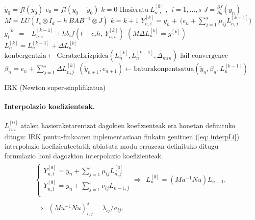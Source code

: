 \begin{algorithm}[H]
 \BlankLine
  $\tilde{y}_0=fl(y_0)$\;
  $e_0=fl(y_0-\tilde{y}_0)$\;
  {
   \BlankLine
   $k=0$\;
   $\text{Hasieratu} \ L_{n,i}^{[0]} \ , \ \ i=1,\dots,s $\;
   \BlankLine
   $J=\frac{\partial f}{\partial y}(y_n) $\; 
   $M=LU(I_s \otimes I_d - h \ BAB^{-1} \otimes J)$\;
   \BlankLine
   {
    \BlankLine 
    $k=k+1$\;
    $Y_{n,i}^{[k]}=y_{n} + \ \big(e_n+\sum\limits_{j=1}^{s} \mu_{ij} L_{n,j}^{[k-1]}\big)  $\;
    $g_i^{[k]}=-L_{n,i}^{[k-1]}+h b_i f(t+c_ih,\ Y_{n,i}^{[k]})$\;
     $(M \Delta L_n^{[k]}=g^{[k]})$\;
    $L_n^{[k]}=L_n^{[k-1]}+\Delta L_n^{[k]}$\;
    $\text{konbergentzia} \leftarrow \text{GeratzeErizpidea}(L_n^{[k]},L_n^{[k-1]},\Delta_{min}) $\;
   }
   \BlankLine
   {
    {$\text{fail convergence}$\;}
   }
   $\beta_{n}={e}_{n} + \sum\limits_{j=1}^{s}\Delta L_{n,j}^{[k]}$\;
   $(\tilde y_{n+1}, e_{n+1})\leftarrow \text{baturakonpentsatua}(\tilde y_{n},\beta_{n},L_{n}^{[k-1]})$\;
 }
 \caption{IRK (Newton super-sinplifikatua)}
 \label{alg:nssli}
\end{algorithm}


\paragraph*{Interpolazio koefizienteak.} $L_{n,i}^{[0]}$ atalen hasieraketarentzat dagokien koefizienteak era honetan definituko ditugu: IRK puntu-finkoaren inplementazioan finkatu genituen (\ref{eq: interpLi}) interpolazio koefizienteetatik abiatuta  modu errazean definituko ditugu formulazio honi dagozkion interpolazio koefizienteak.
\begin{align}
\begin{split}
&\left \{ \begin{array}{c}
  Y_{n,i}^{[0]}=y_n+\sum_{j=1}^{s} \mu_{ij} L_{n,j}^{[0]} \\[.25cm]
  Y_{n,i}^{[0]}=y_n+\sum_{j=1}^{s} \nu_{ij} L_{n-1,j} \\
          \end{array} \right. 
\Rightarrow \ \ L_n^{{[0]}}=(Mu^{-1} Nu) L_{n-1},\\
\\
&\Rightarrow  \ \ (Mu^{-1} Nu)_{i,j}^{s}=\lambda_{ij}/a_{ij}.
\end{split}
\end{align}


